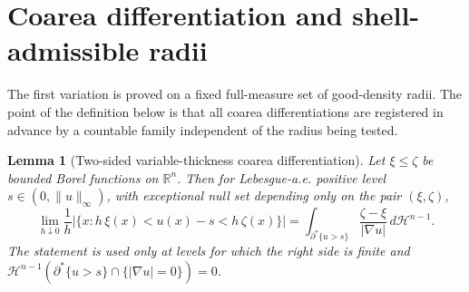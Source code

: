 \documentclass[11pt]{amsart}
\newtheorem{lemma}[theorem]{Lemma}
\theoremstyle{definition}
\newcommand{\R}{\mathbb R}
\newcommand{\Hn}{\mathcal H^{n-1}}
\begin{document}
\section{Coarea differentiation and shell-admissible radii}\label{sec:coarea}

The first variation is proved on a fixed full-measure set of good-density
radii.  The point of the definition below is that all coarea differentiations
are registered in advance by a countable family independent of the radius
being tested.

\begin{lemma}[Two-sided variable-thickness coarea differentiation]
\label{lem:varcoarea}
Let \(\xi\le\zeta\) be bounded Borel functions on \(\R^n\).  Then for
Lebesgue-a.e. positive level \(s\in(0,\|u\|_\infty)\), with exceptional null
set depending only on the pair \((\xi,\zeta)\),
\begin{equation}\label{eq:varcoarea}
   \lim_{h\downarrow0}\frac1h
   \bigl|\{x:h\,\xi(x)<u(x)-s<h\,\zeta(x)\}\bigr|
   =
   \int_{\partial^*\{u>s\}}\frac{\zeta-\xi}{|\nabla u|}\,d\Hn .
\end{equation}
The statement is used only at levels for which the right side is finite and
\(\Hn(\partial^*\{u>s\}\cap\{|\nabla u|=0\})=0\).
\end{lemma}
\end{document}
